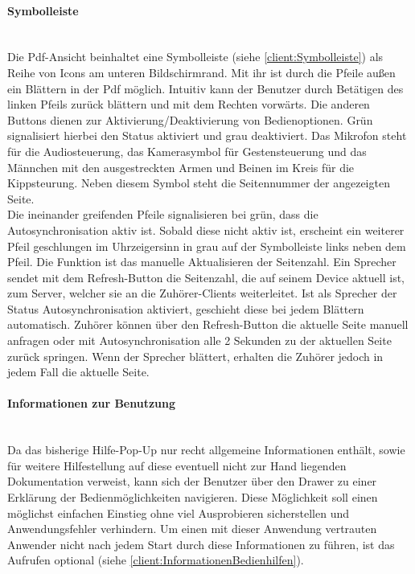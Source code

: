 \paragraph{Symbolleiste}$\;$\\
Die Pdf-Ansicht beinhaltet eine Symbolleiste (siehe \autoref{client:Symbolleiste}) als Reihe von Icons am unteren Bildschirmrand. Mit ihr ist durch die Pfeile außen ein Blättern in der Pdf möglich. Intuitiv  kann der Benutzer durch Betätigen des linken Pfeils zurück blättern und mit dem Rechten vorwärts. Die anderen Buttons dienen zur Aktivierung/Deaktivierung von Bedienoptionen. Grün signalisiert hierbei den Status aktiviert und grau deaktiviert. Das Mikrofon steht für die Audiosteuerung, das Kamerasymbol für  Gestensteuerung und das Männchen mit den ausgestreckten Armen und Beinen im Kreis für die Kippsteurung. Neben diesem Symbol steht die Seitennummer der angezeigten Seite.
\\Die ineinander greifenden Pfeile signalisieren bei grün, dass die Autosynchronisation aktiv ist. Sobald diese nicht aktiv ist, erscheint ein weiterer Pfeil geschlungen im Uhrzeigersinn in grau auf der Symbolleiste links neben dem Pfeil. Die Funktion ist das manuelle Aktualisieren der Seitenzahl. Ein Sprecher sendet mit dem Refresh-Button die Seitenzahl, die auf seinem Device aktuell ist, zum Server, welcher sie an die Zuhörer-Clients weiterleitet. Ist als Sprecher der Status Autosynchronisation aktiviert, geschieht diese bei jedem Blättern automatisch. Zuhörer können über den Refresh-Button die aktuelle Seite manuell anfragen oder mit Autosynchronisation alle 2 Sekunden zu der aktuellen Seite zurück springen. Wenn der Sprecher blättert, erhalten die Zuhörer jedoch in jedem Fall die aktuelle Seite.

\paragraph{Informationen zur Benutzung}$\;$\\
Da das bisherige Hilfe-Pop-Up nur recht allgemeine Informationen enthält, sowie für weitere Hilfestellung auf diese eventuell nicht zur Hand liegenden Dokumentation verweist, kann sich der Benutzer über den Drawer zu einer Erklärung der Bedienmöglichkeiten navigieren. Diese Möglichkeit soll einen möglichst einfachen Einstieg ohne viel Ausprobieren sicherstellen und Anwendungsfehler verhindern. Um einen mit dieser Anwendung vertrauten Anwender nicht nach jedem Start durch diese Informationen zu führen, ist das Aufrufen optional (siehe \autoref{client:InformationenBedienhilfen}).

